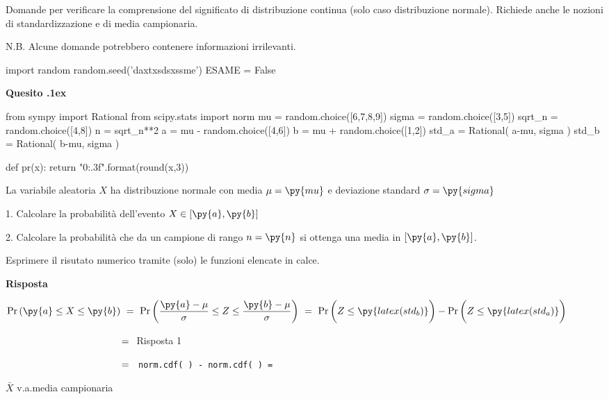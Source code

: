 \documentclass[11pt,twoside,a4paper]{article}
\def\Pr{{\rm Pr\,}}
\newcounter{quesito}
\newenvironment{question}{\addtocounter{quesito}{1}\bigskip\bigskip\par\textbf{Quesito \thequesito.\kern1ex}}{\vspace{\parskip}}
\newenvironment{answer}{\par\textbf{Risposta\quad}}{\vspace{\parskip}}
\begin{document}
\colorbox{blue!10}{\begin{minipage}{\textwidth}
Domande per verificare la comprensione del significato di distribuzione continua (solo caso distribuzione normale). Richiede anche le nozioni di standardizzazione e di media campionaria.\medskip

N.B. Alcune domande potrebbero contenere informazioni irrilevanti.
\end{minipage}}
\bigskip\bigskip


\begin{pycode}
import random
random.seed('daxtxsdsxssme')
ESAME = False
\end{pycode}

\begin{question} %
\begin{pycode}
from sympy import Rational
from scipy.stats import norm
mu = random.choice([6,7,8,9])
sigma = random.choice([3,5])
sqrt_n = random.choice([4,8])
n = sqrt_n**2
a = mu - random.choice([4,6])
b = mu + random.choice([1,2])
std_a = Rational( a-mu, sigma )
std_b = Rational( b-mu, sigma )

def pr(x):
    return "{0:.3f}".format(round(x,3))
\end{pycode}
La variabile aleatoria $X$ ha distribuzione normale con media $\mu=\py{mu}$ e deviazione standard $\sigma=\py{sigma}$ 

1. Calcolare la probabilità dell'evento $X\in [\py{a},\py{b}]$ 

2. Calcolare la probabilità che da un campione di rango $n=\py{n}$ si ottenga una media in $[\py{a},\py{b}]$. 

Esprimere il risutato numerico tramite (solo) le funzioni elencate in calce.
\begin{answer}


$\displaystyle \Pr(\py{a}\le X\le\py{b})
\ =\ 
\Pr\bigg(\dfrac{\py{a}-\mu}{\sigma}\le Z\le\dfrac{\py{b}-\mu}{\sigma}\bigg)
\ =\  
\Pr\bigg(Z\le\py{latex(std_b)}\bigg) -  \Pr\bigg(Z\le\py{latex(std_a)}\bigg)$ 

$\phantom{\Pr\py{a}\le X\le\py{b})}
\ =\ 
${ 
\hfill Risposta 1}

$\phantom{\Pr\py{a}\le X\le\py{b})}
\ =\ 
${\tt\ norm.cdf(  ) -  norm.cdf(  )
= 
}

$\bar X$ v.a.\@ media campionaria


\end{answer}
\end{question}
\end{document}
